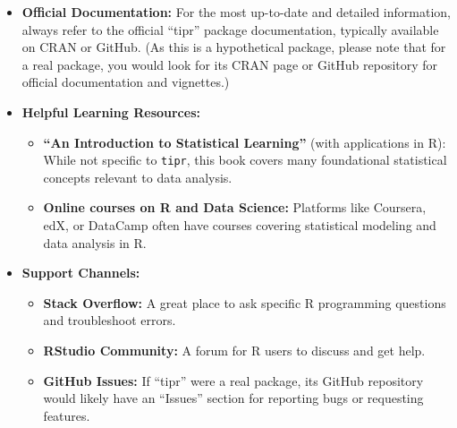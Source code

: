 \documentclass[
  10pt,
  letterpaper,
  DIV=11,
  numbers=noendperiod]{scrartcl}
\providecommand{\tightlist}{%
  \setlength{\itemsep}{0pt}\setlength{\parskip}{0pt}}
\begin{document}
\begin{itemize}
\tightlist
\item
  \textbf{Official Documentation:} For the most up-to-date and detailed
  information, always refer to the official ``tipr'' package
  documentation, typically available on CRAN or GitHub. (As this is a
  hypothetical package, please note that for a real package, you would
  look for its CRAN page or GitHub repository for official documentation
  and vignettes.)
\item
  \textbf{Helpful Learning Resources:}

  \begin{itemize}
  \tightlist
  \item
    \textbf{``An Introduction to Statistical Learning''} (with
    applications in R): While not specific to \texttt{tipr}, this book
    covers many foundational statistical concepts relevant to data
    analysis.
  \item
    \textbf{Online courses on R and Data Science:} Platforms like
    Coursera, edX, or DataCamp often have courses covering statistical
    modeling and data analysis in R.
  \end{itemize}
\item
  \textbf{Support Channels:}

  \begin{itemize}
  \tightlist
  \item
    \textbf{Stack Overflow:} A great place to ask specific R programming
    questions and troubleshoot errors.
  \item
    \textbf{RStudio Community:} A forum for R users to discuss and get
    help.
  \item
    \textbf{GitHub Issues:} If ``tipr'' were a real package, its GitHub
    repository would likely have an ``Issues'' section for reporting
    bugs or requesting features.
  \end{itemize}
\end{itemize}
\end{document}
